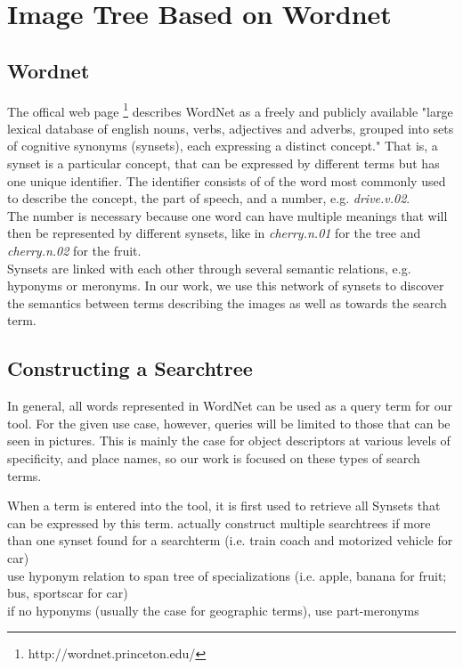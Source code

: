 %
\section{Image Tree Based on Wordnet}
\label{sec_wordnetsearchtree}

\subsection{Wordnet}
The offical web page \footnote{http://wordnet.princeton.edu/} describes WordNet as a freely and publicly available "large lexical database of english nouns, verbs, adjectives and adverbs, grouped into sets of cognitive synonyms (synsets), each expressing a distinct concept." That is, a synset is a particular concept, that can be expressed by different terms but has one unique identifier. The identifier consists of of the word most commonly used to describe the concept, the part of speech, and a number, e.g. \emph{drive.v.02}.\\
The number is necessary because one word can have multiple meanings that will then be represented by different synsets, like in \emph{cherry.n.01} for the tree and \emph{cherry.n.02} for the fruit. \\

Synsets are linked with each other through several semantic relations, e.g. hyponyms or meronyms.
In our work, we use this network of synsets to discover the semantics between terms describing the images as well as towards the search term. \\
  

\subsection{Constructing a Searchtree} 
In general, all words represented in WordNet can be used as a query term for our tool. For the given use case, however, queries will be limited to those that can be seen in pictures. This is mainly the case for object descriptors at various levels of specificity, and place names, so our work is focused on these types of search terms.

When a term is entered into the tool, it is first used to retrieve all Synsets that can be expressed by this term.
actually construct multiple searchtrees if more than one synset found for a searchterm (i.e. train coach and motorized vehicle for car)\\
use hyponym relation to span tree of specializations (i.e. apple, banana for fruit; bus, sportscar for car)\\
if no hyponyms (usually the case for geographic terms), use part-meronyms\\

